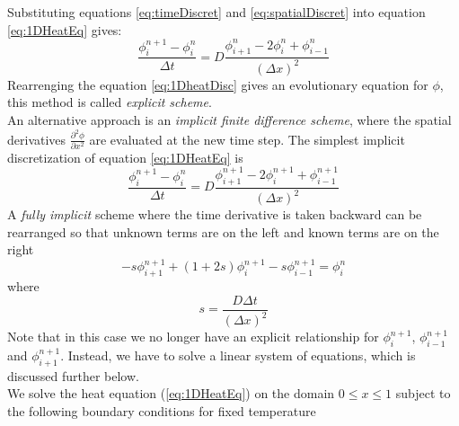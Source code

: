 Substituting equations \ref{eq:timeDiscret} and \ref{eq:spatialDiscret} into equation \ref{eq:1DHeatEq} gives:
\begin{equation}
\frac{\phi^{n+1}_{i}-\phi^{n}_{i}}{\Delta t}=D \frac{\phi^n_{i+1}-2\phi^n_{i}+\phi^n_{i-1}}{(\Delta x)^2}
\label{eq:1DheatDisc}
\end{equation}
Rearrenging the equation \ref{eq:1DheatDisc} gives an evolutionary equation for $\phi$, this method is called \textit{explicit scheme}.
\\
An alternative approach is an \textit{implicit finite difference scheme}, where the spatial derivatives $\frac{\partial^2 \phi}{\partial x^2}$ are evaluated at the new time step. The simplest implicit discretization of equation \ref{eq:1DHeatEq} is
\begin{equation}
\frac{\phi^{n+1}_{i}-\phi^{n}_{i}}{\Delta t}=D \frac{\phi^{n+1}_{i+1}-2\phi^{n+1}_{i}+\phi^{n+1}_{i-1}}{(\Delta x)^2}
\label{eq:1DheatDiscImplicit}
\end{equation}
A \textit{fully implicit} scheme where the time derivative is taken backward can be rearranged so that unknown terms are on the left and known terms are on the right
\begin{equation}
\label{eq:fullyImplicit}
-s \phi^{n+1}_{i+1} + (1+2s) \phi^{n+1}_{i} -s \phi^{n+1}_{i-1}=\phi^{n}_{i}
\end{equation}
where
\begin{equation}
\label{eq:s}
s=\frac{D \Delta t}{(\Delta x)^2}
\end{equation}
Note that in this case we no longer have an explicit relationship for $\phi^{n+1}_{i}$, $\phi^{n+1}_{i-1}$ and $\phi^{n+1}_{i+1}$. Instead, we have to solve a linear system of equations, which is discussed further below.
\\
We solve the heat equation (\ref{eq:1DHeatEq}) on the domain $0 \leq x \leq 1$ subject to the following boundary conditions for fixed temperature

